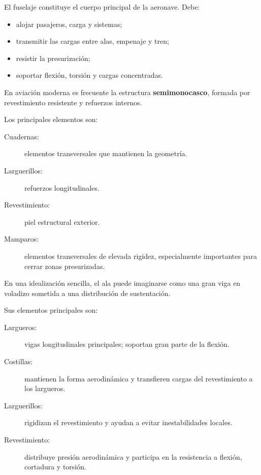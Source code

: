 
El fuselaje constituye el cuerpo principal de la aeronave. Debe:

\begin{itemize}
  \item alojar pasajeros, carga y sistemas;
  \item transmitir las cargas entre alas, empenaje y tren;
  \item resistir la presurización;
  \item soportar flexión, torsión y cargas concentradas.
\end{itemize}

En aviación moderna es frecuente la estructura \textbf{semimonocasco}, formada por revestimiento resistente y refuerzos internos.

Los principales elementos son:

\begin{description}
  \item[Cuadernas:] elementos transversales que mantienen la geometría.
  \item[Larguerillos:] refuerzos longitudinales.
  \item[Revestimiento:] piel estructural exterior.
  \item[Mamparos:] elementos transversales de elevada rigidez, especialmente importantes para cerrar zonas presurizadas.
\end{description}

En una idealización sencilla, el ala puede imaginarse como una gran viga en voladizo sometida a una distribución de sustentación.

Sus elementos principales son:

\begin{description}
  \item[Largueros:] vigas longitudinales principales; soportan gran parte de la flexión.
  \item[Costillas:] mantienen la forma aerodinámica y transfieren cargas del revestimiento a los largueros.
  \item[Larguerillos:] rigidizan el revestimiento y ayudan a evitar inestabilidades locales.
  \item[Revestimiento:] distribuye presión aerodinámica y participa en la resistencia a flexión, cortadura y torsión.
\end{description}

